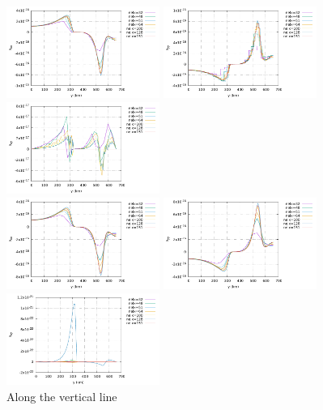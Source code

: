 \begin{center}
\includegraphics[width=5cm]{python_codes/fieldstone_26/results/case1a/vertical_exx.pdf}
\includegraphics[width=5cm]{python_codes/fieldstone_26/results/case1a/vertical_eyy.pdf}
\includegraphics[width=5cm]{python_codes/fieldstone_26/results/case1a/vertical_exy.pdf}\\
\includegraphics[width=5cm]{python_codes/fieldstone_26/results/case1a/vertical_exxn.pdf}
\includegraphics[width=5cm]{python_codes/fieldstone_26/results/case1a/vertical_eyyn.pdf}
\includegraphics[width=5cm]{python_codes/fieldstone_26/results/case1a/vertical_exyn.pdf}\\
{\captionfont Along the vertical line}
\end{center}

